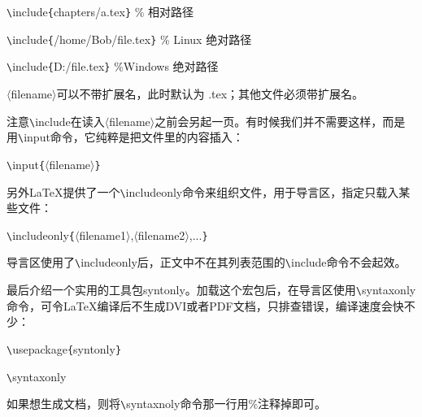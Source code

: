 \documentclass[UTF8]{ctexart}
\begin{document}
\texttt{\textbackslash}include\texttt{\{}chapters/a.tex\texttt{\}} \% 相对路径

\texttt{\textbackslash}include\texttt{\{}/home/Bob/file.tex\texttt{\}} \% Linux 绝对路径

\texttt{\textbackslash}include\texttt{\{}D:/file.tex\texttt{\}} \%Windows 绝对路径

$\langle$filename$\rangle$可以不带扩展名，此时默认为 .tex；其他文件必须带扩展名。

注意\texttt{\textbackslash}include在读入$\langle$filename$\rangle$之前会另起一页。有时候我们并不需要这样，而是用\texttt{\textbackslash}input命令，它纯粹是把文件里的内容插入：

\texttt{\textbackslash}input\texttt{\{}$\langle$filename$\rangle$\texttt{\}}

另外\LaTeX 提供了一个\texttt{\textbackslash}includeonly命令来组织文件，用于导言区，指定只载入某些文件：

\texttt{\textbackslash}includeonly\texttt{\{}$\langle$filename1$\rangle$,$\langle$filename2$\rangle$,...\texttt{\}}

导言区使用了\texttt{\textbackslash}includeonly后，正文中不在其列表范围的\texttt{\textbackslash}include命令不会起效。

最后介绍一个实用的工具包syntonly。加载这个宏包后，在导言区使用\texttt{\textbackslash}syntaxonly命令，可令\LaTeX 编译后不生成DVI或者PDF文档，只排查错误，编译速度会快不少：

\texttt{\textbackslash}usepackage\texttt{\{}syntonly\texttt{\}}

\texttt{\textbackslash}syntaxonly

如果想生成文档，则将\texttt{\textbackslash}syntaxnoly命令那一行用\%注释掉即可。
\end{document}

